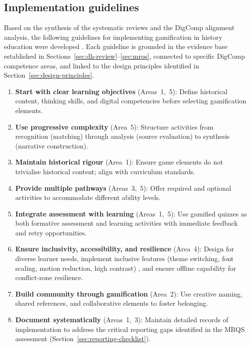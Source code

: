 \subsection{Implementation guidelines} \label{sec:guidelines}

Based on the synthesis of the systematic reviews and the DigComp alignment analysis, the following guidelines for implementing gamification in history education were developed \citep{Korniienko2025cte, Vuorikari2016}. Each guideline is grounded in the evidence base established in Sections~\ref{sec:dh-review}--\ref{sec:mrqs}, connected to specific DigComp competence areas, and linked to the design principles identified in Section~\ref{sec:design-principles}.

\begin{enumerate}
\item \textbf{Start with clear learning objectives} (Areas~1,~5): Define historical content, thinking skills, and digital competencies before selecting gamification elements.
\item \textbf{Use progressive complexity} (Area~5): Structure activities from recognition (matching) through analysis (source evaluation) to synthesis (narrative construction).
\item \textbf{Maintain historical rigour} (Area~1): Ensure game elements do not trivialise historical content; align with curriculum standards.
\item \textbf{Provide multiple pathways} (Areas~3,~5): Offer required and optional activities to accommodate different ability levels.
\item \textbf{Integrate assessment with learning} (Areas~1,~5): Use gamified quizzes as both formative assessment and learning activities with immediate feedback and retry opportunities.
\item \textbf{Ensure inclusivity, accessibility, and resilience} (Area~4): Design for diverse learner needs, implement inclusive features (theme switching, font scaling, motion reduction, high contrast) \cite{McCrindle2013}, and ensure offline capability for conflict-zone resilience.
\item \textbf{Build community through gamification} (Area~2): Use creative naming, shared references, and collaborative elements to foster belonging.
\item \textbf{Document systematically} (Areas~1,~3): Maintain detailed records of implementation to address the critical reporting gaps identified in the MRQS assessment (Section~\ref{sec:reporting-checklist}).
\end{enumerate}

